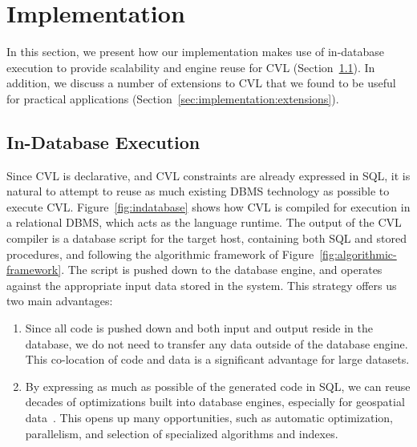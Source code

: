 
\section{Implementation}
\label{sec:implementation}

In this section, we present how our implementation makes use of in-database execution to provide scalability and engine reuse for CVL (Section~\ref{sec:implementation:indatabase}). In addition, we discuss a number of extensions to CVL that we found to be useful for practical applications (Section~\ref{sec:implementation:extensions}). 

\subsection{In-Database Execution}
\label{sec:implementation:indatabase}

Since CVL is declarative, and CVL constraints are already expressed in SQL, it is natural to attempt to reuse as much existing DBMS technology as possible to execute CVL. Figure~\ref{fig:indatabase} shows how CVL is compiled for execution in a relational DBMS, which acts as the language runtime. The output of the CVL compiler is a database script for the target host, containing both SQL and stored procedures, and following the algorithmic framework of Figure~\ref{fig:algorithmic-framework}. The script is pushed down to the database engine, and operates against the appropriate input data stored in the system. This strategy offers us two main advantages:

\begin{enumerate}

\item Since all code is pushed down and both input and output reside in the database, we do not need to transfer any data outside of the database engine. This co-location of code and data is a significant advantage for large datasets.

\item By expressing as much as possible of the generated code in SQL, we can reuse decades of optimizations built into database engines, especially for geospatial data~\cite{Guttman1984:RTree,Hellerstein1995:GiST}. This opens up many opportunities, such as automatic optimization, parallelism, and selection of specialized algorithms and indexes.  

\end{enumerate} 

